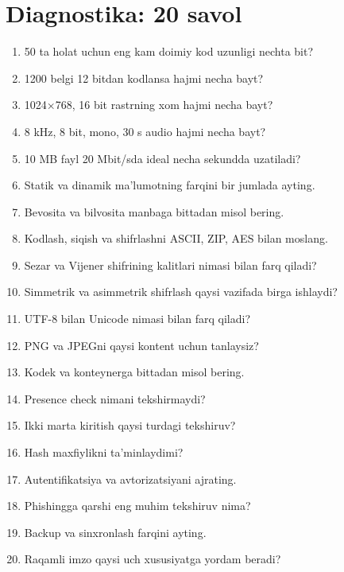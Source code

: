 \documentclass[11pt,a4paper,oneside]{book}
\begin{document}
\section{Diagnostika: 20 savol}
\begin{enumerate}
\item 50 ta holat uchun eng kam doimiy kod uzunligi nechta bit?
\item 1200 belgi 12 bitdan kodlansa hajmi necha bayt?
\item 1024×768, 16 bit rastrning xom hajmi necha bayt?
\item 8 kHz, 8 bit, mono, 30 s audio hajmi necha bayt?
\item 10 MB fayl 20 Mbit/sda ideal necha sekundda uzatiladi?
\item Statik va dinamik ma'lumotning farqini bir jumlada ayting.
\item Bevosita va bilvosita manbaga bittadan misol bering.
\item Kodlash, siqish va shifrlashni ASCII, ZIP, AES bilan moslang.
\item Sezar va Vijener shifrining kalitlari nimasi bilan farq qiladi?
\item Simmetrik va asimmetrik shifrlash qaysi vazifada birga ishlaydi?
\item UTF-8 bilan Unicode nimasi bilan farq qiladi?
\item PNG va JPEGni qaysi kontent uchun tanlaysiz?
\item Kodek va konteynerga bittadan misol bering.
\item Presence check nimani tekshirmaydi?
\item Ikki marta kiritish qaysi turdagi tekshiruv?
\item Hash maxfiylikni ta'minlaydimi?
\item Autentifikatsiya va avtorizatsiyani ajrating.
\item Phishingga qarshi eng muhim tekshiruv nima?
\item Backup va sinxronlash farqini ayting.
\item Raqamli imzo qaysi uch xususiyatga yordam beradi?
\end{enumerate}
\end{document}
